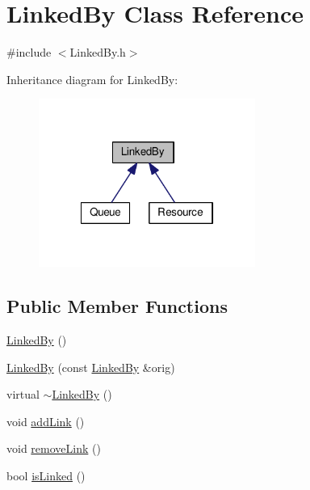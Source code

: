 \hypertarget{class_linked_by}{\section{Linked\-By Class Reference}
\label{class_linked_by}
}


{\ttfamily \#include $<$Linked\-By.\-h$>$}



Inheritance diagram for Linked\-By\-:\nopagebreak
\begin{figure}[H]
\begin{center}
\leavevmode
\includegraphics[width=201pt]{class_linked_by__inherit__graph}
\end{center}
\end{figure}
\subsection*{Public Member Functions}
\begin{DoxyCompactItemize}
\item 
\hyperlink{class_linked_by_af786842e7d3f98fe43067114dc777b8b}{Linked\-By} ()
\item 
\hyperlink{class_linked_by_ace412273cc6d87ffab7da022c2ae0d65}{Linked\-By} (const \hyperlink{class_linked_by}{Linked\-By} \&orig)
\item 
virtual \hyperlink{class_linked_by_af5c2ee380dcad914ac10cf4132e4a7ae}{$\sim$\-Linked\-By} ()
\item 
void \hyperlink{class_linked_by_afbfa186e0511d6ce2efdb58c89d834c9}{add\-Link} ()
\item 
void \hyperlink{class_linked_by_a2cd33b134ec4bf9043d0bf7e7d4d8f25}{remove\-Link} ()
\item 
bool \hyperlink{class_linked_by_a5f1cd64ec1f6eb15f06d3332071d82b7}{is\-Linked} ()
\end{DoxyCompactItemize}


